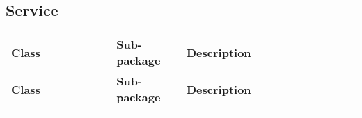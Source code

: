 \subsection*{Service}
\renewcommand{\arraystretch}{1.5} %
\begin{longtable}{|>{\raggedright\arraybackslash}m{0.3\linewidth}|>{\raggedright\arraybackslash}m{0.2\linewidth}|>{\raggedright\arraybackslash}m{0.5\linewidth}|}
   
    \hline
    \textbf{Class} & \textbf{Sub-package} & \textbf{Description} \\
    \hline
    \endfirsthead

    \hline
    \textbf{Class} & \textbf{Sub-package} & \textbf{Description} \\
    \hline
    \endhead

    \hline
    \endfoot

    \hline
    \endlastfoot


\end{longtable}
